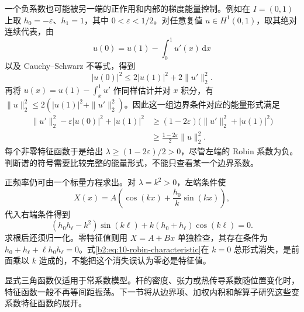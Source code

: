 \ProseParagraphBreak

一个负系数也可能被另一端的正作用和内部的梯度能量控制。例如在 \(I=(0,1)\) 上取 \(h_0=-\varepsilon\)、\(h_1=1\)，其中 \(0<\varepsilon<1/2\)。对任意复值 \(u\in H^1(0,1)\)，取其绝对连续代表，由
\[
 u(0)=u(1)-\int_0^1u'(x)\,\mathrm{d}x
\]
以及 Cauchy--Schwarz 不等式，得到
\[
 |u(0)|^2\leq2|u(1)|^2+2\|u'\|_2^2.
\]
再将 \(u(x)=u(1)-\int_x^1u'\) 作同样估计并对 \(x\) 积分，有 \(\|u\|_2^2\leq2(|u(1)|^2+\|u'\|_2^2)\)。因此这一组边界条件对应的能量形式满足
\[
 \begin{aligned}
 \|u'\|_2^2-\varepsilon|u(0)|^2+|u(1)|^2
 &\geq(1-2\varepsilon)\bigl(\|u'\|_2^2+|u(1)|^2\bigr)\\
 &\geq\frac{1-2\varepsilon}{2}\|u\|_2^2.
 \end{aligned}
\]
每个非零特征函数于是给出 \(\lambda\geq(1-2\varepsilon)/2>0\)，尽管左端的 Robin 系数为负。判断谱的符号需要比较完整的能量形式，不能只查看某一个边界系数。

\ProseParagraphBreak

正频率仍可由一个标量方程求出。对 \(\lambda=k^2>0\)，左端条件使
\[
 X(x)=A\left(\cos(kx)+\dfrac{h_0}{k}\sin(kx)\right),
\]
代入右端条件得到
\begin{equation}\label{b2:eq:10-robin-characteristic}
 (h_0h_\ell-k^2)\sin(k\ell)
 +k(h_0+h_\ell)\cos(k\ell)=0.
\end{equation}
求根后还须归一化。零特征值则用 \(X=A+Bx\) 单独检查，其存在条件为 \(h_0+h_\ell+\ell h_0h_\ell=0\)。式\eqref{b2:eq:10-robin-characteristic}在 \(k=0\) 总形式消失，是前面乘以 \(k\) 造成的，不能把这个消失误认为零必是特征值。

\ProseParagraphBreak

显式三角函数仅适用于常系数模型。杆的密度、张力或热传导系数随位置变化时，特征函数一般不再等间距振荡。下一节将从边界项、加权内积和解算子研究这些变系数特征函数的展开。
